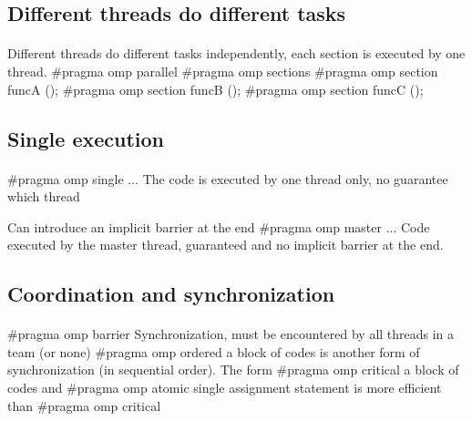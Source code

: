 \documentclass[%
oneside,                 %
final,                   %
10pt]{article}
\begin{document}
\subsection{Different threads do different tasks}

\paragraph{}

Different threads do different tasks independently, each section is executed by one thread.
\bcppcod
#pragma omp parallel
{
#pragma omp sections
{
#pragma omp section
funcA ();
#pragma omp section
funcB ();
#pragma omp section
funcC ();
}
}
\ecppcod



\subsection{Single execution}

\paragraph{}
\bcppcod
#pragma omp single { ... }
\ecppcod
The code is executed by one thread only, no guarantee which thread

Can introduce an implicit barrier at the end
\bcppcod
#pragma omp master { ... }
\ecppcod
Code executed by the master thread, guaranteed and no implicit barrier at the end.




\subsection{Coordination and synchronization}

\paragraph{}
\bcppcod
#pragma omp barrier
\ecppcod
Synchronization, must be encountered by all threads in a team (or none)
\bcppcod
#pragma omp ordered { a block of codes }
\ecppcod
is another form of synchronization (in sequential order).
The form
\bcppcod
#pragma omp critical { a block of codes }
\ecppcod
and 
\bcppcod
#pragma omp atomic { single assignment statement }
\ecppcod
is  more efficient than 
\bcppcod
#pragma omp critical
\ecppcod
\end{document}
